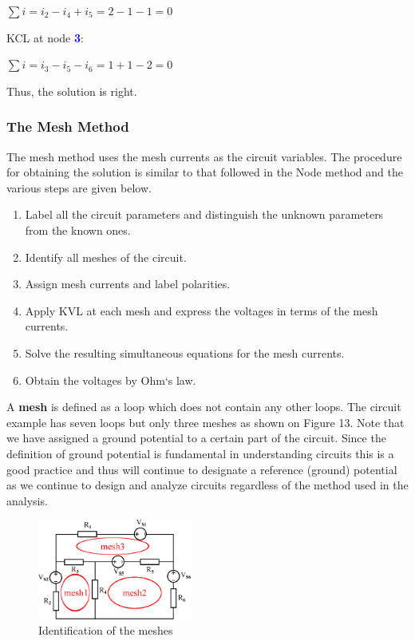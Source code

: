 \documentclass[a4 paper]{article}
\newcommand{\blue}[1]{\textcolor{blue}{#1}}
\numberwithin{equation}{section}
\newcommand{\0}{\mathbf{0}}
\begin{document}
\hspace{6.6 cm}$\sum i = i_2 - i_4 + i_5 = 2 - 1 - 1 = 0$

\vspace{2 mm}
KCL at node \blue{\bf 3}:

\hspace{6.6 cm}$\sum i = i_3 - i_5 - i_6 = 1 + 1 - 2 = 0$

Thus, the solution is right.










\subsubsection{The Mesh Method}

The mesh method uses the mesh currents as the circuit variables. The procedure for obtaining the solution is similar to that followed in the Node method and the various steps are given below. 



\begin{enumerate} \itemsep1pt \parskip0pt 
  \item Label all the circuit parameters and distinguish the unknown parameters from the known ones.
  \item Identify all meshes of the circuit.
  \item Assign mesh currents and label polarities.
  \item Apply KVL at each mesh and express the voltages in terms of the mesh currents.
  \item Solve the resulting simultaneous equations for the mesh currents.
  \item Obtain the voltages by Ohm`s law.
\end{enumerate}




A {\bf mesh} is defined as a loop which does not contain any other loops. The circuit example has seven loops but only three meshes as shown on Figure 13. Note that we have assigned a ground potential to a certain part of the circuit. Since the definition of ground potential is fundamental in understanding circuits this is a good practice and thus will continue to designate a reference (ground) potential as we continue to design and analyze circuits regardless of the method used in the analysis. 


\begin{figure}[ht!]
  \caption{Identification of the meshes}
  \centering
  \hspace{5 mm}
  \includegraphics[width=0.45\textwidth]{./images/meshmethod_}
\end{figure}
\end{document}
